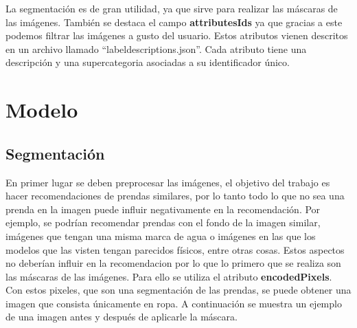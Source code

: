 \documentclass[12pt]{report} %
\begin{document}
	La segmentación es de gran utilidad, ya que sirve para realizar las máscaras de las imágenes. 
	También se destaca el campo \textbf{attributesIds} ya que gracias a este podemos filtrar las 
	imágenes a gusto del usuario. Estos atributos vienen descritos en un archivo llamado ``label\textunderscore descriptions.json''.
	Cada atributo tiene una descripción y una supercategoria asociadas a su identificador único.

	\section{Modelo}
	\subsection{Segmentación}
	En primer lugar se deben preprocesar las imágenes, el objetivo del trabajo es hacer recomendaciones de prendas similares, por lo tanto
	todo lo que no sea una prenda en la imagen puede influir negativamente en la recomendación. Por ejemplo, se podrían recomendar prendas
	con el fondo de la imagen similar, imágenes que tengan una misma marca de agua o imágenes en las que los modelos que las visten tengan
	parecidos físicos, entre otras cosas.
	Estos aspectos no deberían influir en la recomendacion por lo que lo primero que se realiza son las máscaras de las imágenes. 
	Para ello se utiliza el atributo \textbf{encodedPixels}.
	Con estos pixeles, que son una segmentación de las prendas, se puede obtener una imagen que consista únicamente en ropa.
	A continuación se muestra un ejemplo de una imagen antes y después de aplicarle la máscara.
\end{document}
